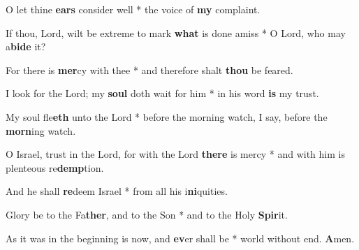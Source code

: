 \begin{multicols}{2}
	O let thine \textbf{ears} consider well * the voice of \textbf{my} complaint.
	
	If thou, Lord, wilt be extreme to mark \textbf{what} is done amiss * O Lord, who may a\textbf{bide} it?
	
	For there is \textbf{mer}cy with thee * and therefore shalt \textbf{thou} be feared.
	
	I look for the Lord; my \textbf{soul} doth wait for him * in his word \textbf{is} my trust.
	
	My soul fle\textbf{eth} unto the Lord * before the morning watch, I say, before the \textbf{morn}ing watch.
	
	O Israel, trust in the Lord, for with the Lord \textbf{there} is mercy * and with him is plenteous re\textbf{demp}tion.
	
	And he shall \textbf{re}deem Israel * from all his i\textbf{ni}quities.
	
	Glory be to the Fa\textbf{ther}, and to the Son * and to the Holy \textbf{Spir}it.
	
	As it was in the beginning is now, and \textbf{ev}er shall be * world without end. \textbf{A}men.
\end{multicols}